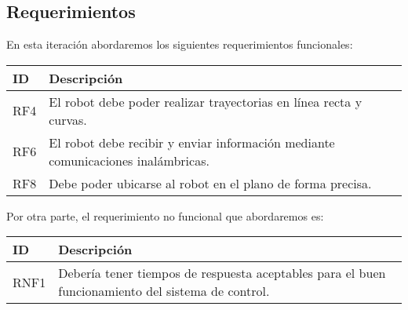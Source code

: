 \subsection{Requerimientos}

En esta iteración abordaremos los siguientes requerimientos funcionales:

\begin{center}
    \begin{tabular} {
        | >{\centering\arraybackslash}m{1cm}
        | >{\centering\arraybackslash}m{13cm} |}
        \hline \rowcolor{test_header_color}
            ID & Descripción \\
        \hline
            RF4 & El robot debe poder realizar trayectorias en línea recta y curvas. \\
        \hline
            RF6 & El robot debe recibir y enviar información mediante comunicaciones inalámbricas. \\
        \hline
            RF8 & Debe poder ubicarse al robot en el plano de forma precisa. \\
        \hline
    \end{tabular}
\end{center}

   Por otra parte, el requerimiento no funcional que abordaremos es:

\begin{center}
    \begin{tabular} {
        | >{\centering\arraybackslash}m{1cm}
        | >{\centering\arraybackslash}m{13cm} |}
        \hline \rowcolor{test_header_color}
            ID & Descripción \\
        \hline
            RNF1 & Debería tener tiempos de respuesta aceptables para el buen funcionamiento del sistema de control. \\
        \hline
    \end{tabular}
\end{center}